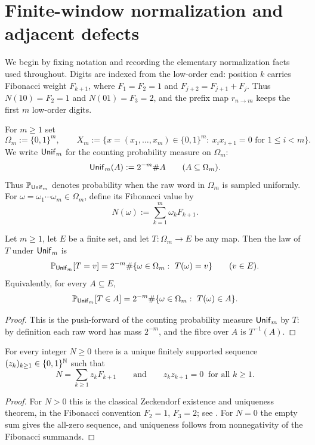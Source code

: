 \section{Finite-window normalization and adjacent defects}
\label{sec:adjacent}

We begin by fixing notation and recording the elementary normalization facts
used throughout.  Digits are indexed from the low-order end: position $k$
carries Fibonacci weight $F_{k+1}$, where $F_1=F_2=1$ and
$F_{j+2}=F_{j+1}+F_j$.  Thus $N(10)=F_2=1$ and $N(01)=F_3=2$, and the prefix
map $r_{n\to m}$ keeps the first $m$ low-order digits.

For $m\ge 1$ set
\[
\Omega_m:=\{0,1\}^m,
\qquad
X_m:=\{x=(x_1,\dots,x_m)\in\{0,1\}^m:\ x_ix_{i+1}=0\text{ for }1\le i<m\}.
\]
We write $\mathsf{Unif}_m$ for the counting probability measure on $\Omega_m$:
\[
\mathsf{Unif}_m(A):=2^{-m}\#A\qquad(A\subseteq\Omega_m).
\]
Thus $\mathbb{P}_{\mathsf{Unif}_m}$ denotes probability when the raw word in $\Omega_m$ is
sampled uniformly.
For $\omega=\omega_1\cdots\omega_m\in\Omega_m$, define its Fibonacci value by
\[
N(\omega):=\sum_{k=1}^m\omega_kF_{k+1}.
\]

\begin{lemma}
\label{lem:raw-counting-law}
Let $m\ge 1$, let $E$ be a finite set, and let $T:\Omega_m\to E$ be any map.
Then the law of $T$ under $\mathsf{Unif}_m$ is
\[
\PP_{\Unif_m}[T=v]=2^{-m}\#\{\omega\in\Omega_m:\ T(\omega)=v\}
\qquad(v\in E).
\]
Equivalently, for every $A\subseteq E$,
\[
\mathbb{P}_{\mathsf{Unif}_m}[T\in A]=2^{-m}\#\{\omega\in\Omega_m:\ T(\omega)\in A\}.
\]
\end{lemma}

\begin{proof}
This is the push-forward of the counting probability measure $\mathsf{Unif}_m$ by
$T$: by definition each raw word has mass $2^{-m}$, and the fibre over $A$ is
$T^{-1}(A)$.
\end{proof}
\begin{lemma}
\label{lem:zeckendorf-well-defined}
For every integer $N\ge 0$ there is a unique finitely supported sequence
$(z_k)_{k\ge 1}\in\{0,1\}^{\mathbb{N}}$ such that
\[
N=\sum_{k\ge 1}z_kF_{k+1}
\qquad\text{and}\qquad
z_kz_{k+1}=0\ \text{ for all }k\ge 1.
\]
\end{lemma}

\begin{proof}
For $N>0$ this is the classical Zeckendorf existence and uniqueness theorem,
in the Fibonacci convention $F_2=1$, $F_3=2$; see
\cite{Lekkerkerker1952,Zeckendorf1972,Carlitz1968,CarlitzScovHoggatt1972}.
For $N=0$ the empty sum gives the all-zero sequence, and uniqueness follows
from nonnegativity of the Fibonacci summands.
\end{proof}

